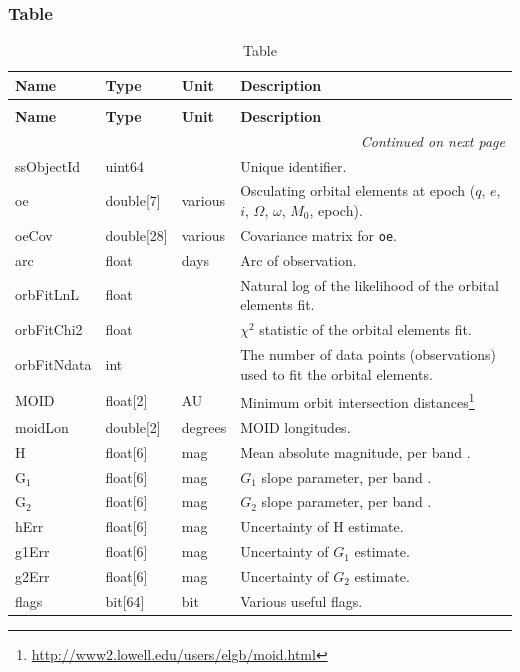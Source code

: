 \documentclass[SE,lsstdraft,toc]{lsstdoc}
\newenvironment{schema}[3]{%
\setlength\LTleft{0pt}
\setlength\LTright{\fill}
\begin{longtable}{p{0.2\textwidth}p{0.14\textwidth}p{0.14\textwidth}p{0.41\textwidth}}

\caption[#1]{#2\label{#3}}\\

\hline \textbf{Name} & \textbf{Type} & \textbf{Unit} & \textbf{Description}\\ \hline
\endfirsthead

\caption[#1]{#2}\\

\hline \textbf{Name} & \textbf{Type} & \textbf{Unit} & \textbf{Description}\\ \hline
\endhead

\hline \multicolumn{4}{r}{\emph{Continued on next page}} \\
\endfoot

\hline\hline
\endlastfoot
}{%
\hline
\end{longtable}
}
\begin{document}
\subsubsection{\SSObject Table}


\begin{schema}{\SSObject Table}{\SSObject Table}{tbl:ssobjectTable}

ssObjectId & uint64 & ~ & Unique identifier. \\

oe & double[7] & various & Osculating orbital elements at epoch ($q$, $e$, $i$, $\Omega$, $\omega$, $M_0$, epoch). \\

oeCov & double[28] & various & Covariance matrix for \texttt{oe}. \\

arc & float & days & Arc of observation. \\

orbFitLnL & float & ~ & Natural log of the likelihood of the orbital elements fit. \\

orbFitChi2 & float & ~ & $\chi^2$ statistic of the orbital elements fit. \\

orbFitNdata & int & ~ & The number of data points (observations) used to fit the orbital elements. \\

MOID & float[2] & AU & Minimum orbit intersection distances\footnote{\url{http://www2.lowell.edu/users/elgb/moid.html}} \\

moidLon & double[2] & degrees & MOID longitudes. \\

H & float[6] & mag & Mean absolute magnitude, per band \citep[][magnitude-phase system]{2010Icar..209..542M}. \\

$\mathrm{G_1}$ & float[6] & mag & $G_1$ slope parameter, per band \citep[][magnitude-phase system]{2010Icar..209..542M}. \\

$\mathrm{G_2}$ & float[6] & mag & $G_2$ slope parameter, per band \citep[][magnitude-phase system]{2010Icar..209..542M}. \\

hErr & float[6] & mag & Uncertainty of H estimate.\\

g1Err & float[6] & mag & Uncertainty of $G_1$ estimate. \\

g2Err & float[6] & mag & Uncertainty of $G_2$ estimate. \\

flags & bit[64] & bit & Various useful flags. \\

\end{schema}
\end{document}
